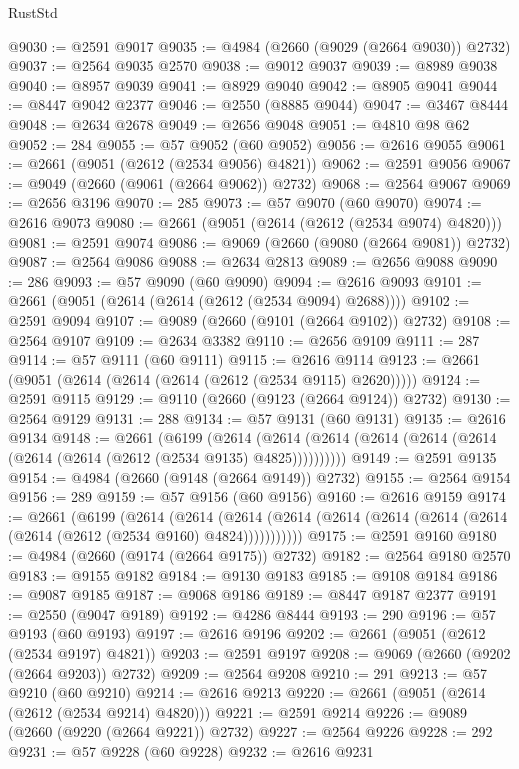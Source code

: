 \begin{lexlean}{RustStd}
\begin{coremodule}
@9030 := @2591 @9017
@9035 := @4984 (@2660 (@9029 (@2664 @9030)) @2732)
@9037 := @2564 @9035 @2570
@9038 := @9012 @9037
@9039 := @8989 @9038
@9040 := @8957 @9039
@9041 := @8929 @9040
@9042 := @8905 @9041
@9044 := @8447 @9042 @2377
@9046 := @2550 (@8885 @9044)
@9047 := @3467 @8444
@9048 := @2634 @2678
@9049 := @2656 @9048
@9051 := @4810 @98 @62
@9052 := 284
@9055 := @57 @9052 (@60 @9052)
@9056 := @2616 @9055
@9061 := @2661 (@9051 (@2612 (@2534 @9056) @4821))
@9062 := @2591 @9056
@9067 := @9049 (@2660 (@9061 (@2664 @9062)) @2732)
@9068 := @2564 @9067
@9069 := @2656 @3196
@9070 := 285
@9073 := @57 @9070 (@60 @9070)
@9074 := @2616 @9073
@9080 := @2661 (@9051 (@2614 (@2612 (@2534 @9074) @4820)))
@9081 := @2591 @9074
@9086 := @9069 (@2660 (@9080 (@2664 @9081)) @2732)
@9087 := @2564 @9086
@9088 := @2634 @2813
@9089 := @2656 @9088
@9090 := 286
@9093 := @57 @9090 (@60 @9090)
@9094 := @2616 @9093
@9101 := @2661 (@9051 (@2614 (@2614 (@2612 (@2534 @9094) @2688))))
@9102 := @2591 @9094
@9107 := @9089 (@2660 (@9101 (@2664 @9102)) @2732)
@9108 := @2564 @9107
@9109 := @2634 @3382
@9110 := @2656 @9109
@9111 := 287
@9114 := @57 @9111 (@60 @9111)
@9115 := @2616 @9114
@9123 := @2661 (@9051 (@2614 (@2614 (@2614 (@2612 (@2534 @9115) @2620)))))
@9124 := @2591 @9115
@9129 := @9110 (@2660 (@9123 (@2664 @9124)) @2732)
@9130 := @2564 @9129
@9131 := 288
@9134 := @57 @9131 (@60 @9131)
@9135 := @2616 @9134
@9148 := @2661
    (@6199
      (@2614 (@2614 (@2614 (@2614 (@2614 (@2614 (@2614 (@2614 (@2612 (@2534 @9135) @4825))))))))))
@9149 := @2591 @9135
@9154 := @4984 (@2660 (@9148 (@2664 @9149)) @2732)
@9155 := @2564 @9154
@9156 := 289
@9159 := @57 @9156 (@60 @9156)
@9160 := @2616 @9159
@9174 := @2661
    (@6199
      (@2614
        (@2614
          (@2614 (@2614 (@2614 (@2614 (@2614 (@2614 (@2614 (@2612 (@2534 @9160) @4824)))))))))))
@9175 := @2591 @9160
@9180 := @4984 (@2660 (@9174 (@2664 @9175)) @2732)
@9182 := @2564 @9180 @2570
@9183 := @9155 @9182
@9184 := @9130 @9183
@9185 := @9108 @9184
@9186 := @9087 @9185
@9187 := @9068 @9186
@9189 := @8447 @9187 @2377
@9191 := @2550 (@9047 @9189)
@9192 := @4286 @8444
@9193 := 290
@9196 := @57 @9193 (@60 @9193)
@9197 := @2616 @9196
@9202 := @2661 (@9051 (@2612 (@2534 @9197) @4821))
@9203 := @2591 @9197
@9208 := @9069 (@2660 (@9202 (@2664 @9203)) @2732)
@9209 := @2564 @9208
@9210 := 291
@9213 := @57 @9210 (@60 @9210)
@9214 := @2616 @9213
@9220 := @2661 (@9051 (@2614 (@2612 (@2534 @9214) @4820)))
@9221 := @2591 @9214
@9226 := @9089 (@2660 (@9220 (@2664 @9221)) @2732)
@9227 := @2564 @9226
@9228 := 292
@9231 := @57 @9228 (@60 @9228)
@9232 := @2616 @9231

\end{coremodule}
\end{lexlean}
